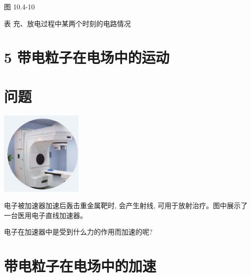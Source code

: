 \documentclass[10pt]{article}
\begin{document}
图 10.4-10

表 充、放电过程中某两个时刻的电路情况

\begin{center}
\end{center}

\section*{5 带电粒子在电场中的运动}

\section*{问题}

\begin{center}
\includegraphics[max width=0.3\textwidth]{images/01911d5f-8e38-70c0-b5b8-2b399bd115b6_49_976423.jpg}
\end{center}

电子被加速器加速后轰击重金属靶时, 会产生射线, 可用于放射治疗。图中展示了一台医用电子直线加速器。

电子在加速器中是受到什么力的作用而加速的呢?

\section*{带电粒子在电场中的加速}
\end{document}
